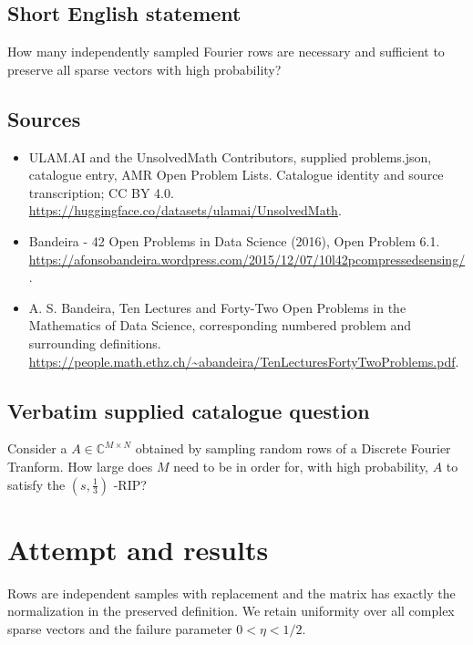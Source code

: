 \documentclass[11pt]{article}
\begin{document}
\subsection{Short English statement}
How many independently sampled Fourier rows are necessary and sufficient to preserve all sparse vectors with high probability?
\subsection{Sources}
\begin{itemize}
\item[S1] ULAM.AI and the UnsolvedMath Contributors, supplied problems.json, catalogue entry, AMR Open Problem Lists. Catalogue identity and source transcription; CC BY 4.0.
\url{https://huggingface.co/datasets/ulamai/UnsolvedMath}.
\item[S2] Bandeira - 42 Open Problems in Data Science (2016), Open Problem 6.1. 
\url{https://afonsobandeira.wordpress.com/2015/12/07/10l42pcompressedsensing/}.
\item[S3] A. S. Bandeira, Ten Lectures and Forty-Two Open Problems in the Mathematics of Data Science, corresponding numbered problem and surrounding definitions.
\url{https://people.math.ethz.ch/~abandeira/TenLecturesFortyTwoProblems.pdf}.
\end{itemize}
\subsection{Verbatim supplied catalogue question}
Consider a $A\in\mathbb{C}^{M\times N}$ obtained by sampling random rows of a Discrete Fourier Tranform. How large does $M$ need to be in order for, with high probability, $A$ to satisfy the $(s,\frac13)$ -RIP?

\section{Attempt and results}
Rows are independent samples with replacement and the matrix has exactly the
normalization in the preserved definition. We retain uniformity over all
complex sparse vectors and the failure parameter $0<\eta<1/2$.
\end{document}
